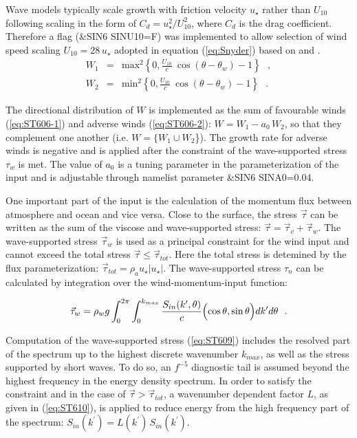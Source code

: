 Wave models typically scale
growth with friction velocity $u_\star$ rather than $U_{10}$ following scaling
in the form of $C_d=u^2_\star/U^2_{10}$, where $C_d$ is the drag
coefficient. Therefore a flag ({\code \&SIN6 SINU10=F}) was implemented to
allow selection of wind speed scaling $U_{10} = 28\,u_{\star}$ adopted in
equation (\ref{eq:Snyder}) based on \citet{art:Sea81} and \citet{art:KHH84}.
\begin{eqnarray}
W_1 & = & \mathrm{max}^2 \left \{ 0,\frac{U_{10}}{c}\ \cos(\theta-\theta_w)-1
\right \} \:\:\: , \label{eq:ST606-1} \\
W_2 & = & \mathrm{min}^2 \left \{ 0,\frac{U_{10}}{c}\ \cos(\theta-\theta_w)-1
\right \} \:\:\: .\label{eq:ST606-2} 
\end{eqnarray}

\noindent
The directional distribution of $W$ is implemented as the sum of favourable
winds (\ref{eq:ST606-1}) and adverse winds (\ref{eq:ST606-2}):
$W=W_1-a_0\,W_2$, so that they complement one another (i.e. $W=\{W_1\cup
W_2$\}).  The growth rate for adverse winds is negative \citep{art:Dea06} and
is applied after the constraint of the wave-supported stress $\tau_w$ is
met. The value of $a_0$ is a tuning parameter in the parameterization of the
input and is adjustable through namelist parameter {\code \&SIN6 SINA0=0.04}.

One important part of the input is the calculation of the momentum flux
between atmosphere and ocean and vice versa. Close to the surface, the stress
$\vec{\tau}$ can be written as the sum of the viscose and wave-supported
stress: $\vec{\tau} = \vec{\tau}_{v} + \vec{\tau}_{w}$. The wave-supported
stress $ \vec{\tau}_{w}$ is used as a principal constraint for the wind input
and cannot exceed the total stress $\vec{\tau} \le \vec{\tau}_{tot}$.  Here
the total stress is detemined by the flux parameterization:
$\vec{\tau}_{tot}=\rho_a u_\star|u_\star|$. The wave-supported stress $\tau_n$
can be calculated by integration over the wind-momentum-input function:

\begin{equation}\label{eq:ST609}
   \vec{\tau}_w = \rho_w g \int_{0}^{2\pi} \int_{0}^{k_{max}}
   \frac{S_{in}(k^\prime,\theta)}{c} \Bigl (\cos\theta,\sin\theta \Bigr )
   dk^\prime d\theta \:\:\: . 
\end{equation}

\noindent
Computation of the wave-supported stress (\ref{eq:ST609}) includes the
resolved part of the spectrum up to the highest discrete wavenumber $k_{max}$,
as well as the stress supported by short waves. To do so, an $f^{-5}$
diagnostic tail is assumed beyond the highest frequency in the energy density
spectrum. In order to satisfy the constraint and in the case of $\vec{\tau} >
\vec{\tau}_{tot}$, a wavenumber dependent factor $L$, as given in
(\ref{eq:ST610}), is applied to reduce energy from the high frequency part of
the spectrum: $S_{in}(k^\prime)=L(k^\prime)\,S_{in}(k^\prime)$.

